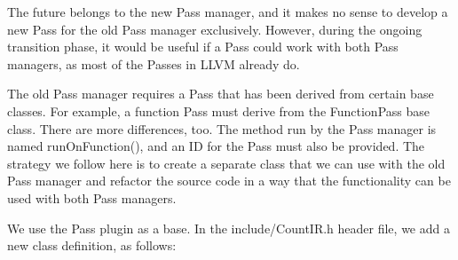 
The future belongs to the new Pass manager, and it makes no sense to develop a new Pass for the old Pass manager exclusively. However, during the ongoing transition phase, it would be useful if a Pass could work with both Pass managers, as most of the Passes in LLVM already do.\par

The old Pass manager requires a Pass that has been derived from certain base classes. For example, a function Pass must derive from the FunctionPass base class. There are more differences, too. The method run by the Pass manager is named runOnFunction(), and an ID for the Pass must also be provided. The strategy we follow here is to create a separate class that we can use with the old Pass manager and refactor the source code in a way that the functionality can be used with both Pass managers.\par

We use the Pass plugin as a base. In the include/CountIR.h header file, we add a new class definition, as follows:\par

